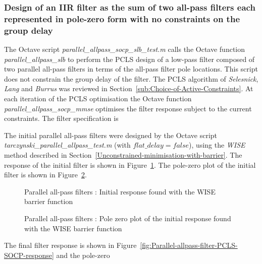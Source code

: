 \documentclass[a4paper,twoside,10pt,english]{report}
\begin{document}
\subsubsection{\label{sec:Design-IIR-filter-sum-all-pass-filters-pole-zero-no-constraints-on-group-delay}Design of an IIR filter as the sum of two all-pass filters each represented in pole-zero form with no constraints on the group delay}
The Octave script \emph{parallel\_allpass\_socp\_slb\_test.m} calls the Octave
function \emph{parallel\_allpass\_slb} to perform the PCLS design of a low-pass
filter composed of two parallel all-pass filters in terms of the all-pass filter
pole locations. This script does not constrain the group delay of the filter. 
The PCLS algorithm of \emph{Selesnick}, \emph{Lang} and 
\emph{Burrus} was reviewed in Section~\ref{sub:Choice-of-Active-Constraints}. At
each iteration of the PCLS optimisation the Octave function 
\emph{parallel\_allpass\_socp\_mmse} optimises the filter response subject to 
the current constraints. The filter specification is
\begin{small}

\end{small}
The initial parallel all-pass filters were designed by the Octave script 
\emph{tarczynski\_parallel\_allpass\_test.m} (with $flat\_delay=false$), 
using the \emph{WISE} method described in 
Section~\ref{Unconstrained-minimisation-with-barrier}. The response
of the initial filter is shown in
Figure~\ref{fig:Parallel-allpass-filter-initial-response}.
The pole-zero plot of the initial filter is shown in
Figure~\ref{fig:Parallel-allpass-filter-initial-response-pz}.
\begin{figure}[!htbp]
\begin{center}
\scalebox{0.7}{}
\caption{Parallel all-pass filters : Initial response found with the WISE barrier function}
\label{fig:Parallel-allpass-filter-initial-response}
\end{center}
\end{figure}
\begin{figure}[!htbp]
\begin{center}
\scalebox{0.7}{}
\caption{Parallel all-pass filters : Pole zero plot of the initial response found with the WISE barrier function}
\label{fig:Parallel-allpass-filter-initial-response-pz}
\end{center}
\end{figure}
The final filter response is shown in
Figure~\ref{fig:Parallel-allpass-filter-PCLS-SOCP-response} and the pole-zero
\end{document}
